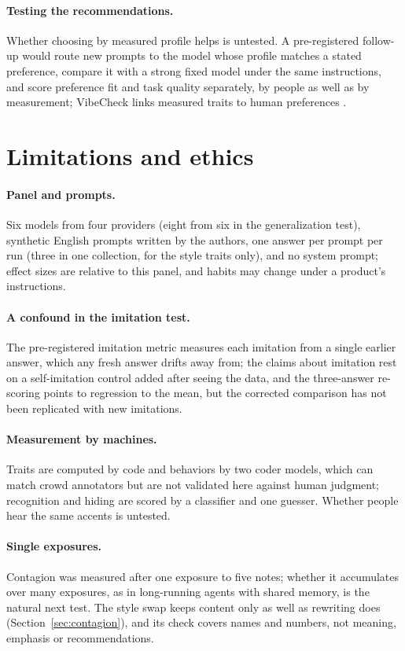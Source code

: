 \documentclass[11pt]{article}
\begin{document}
\paragraph{Testing the recommendations.}
Whether choosing by measured profile helps is untested.
A pre-registered follow-up would route new prompts to the model whose profile matches a stated preference, compare it with a strong fixed model under the same instructions, and score preference fit and task quality separately, by people as well as by measurement; VibeCheck links measured traits to human preferences \citep{dunlap2025vibecheck}.

\section{Limitations and ethics}
\label{sec:limits}
\paragraph{Panel and prompts.} Six models from four providers (eight from six in the generalization test), synthetic English prompts written by the authors, one answer per prompt per run (three in one collection, for the style traits only), and no system prompt; effect sizes are relative to this panel, and habits may change under a product's instructions.
\paragraph{A confound in the imitation test.} The pre-registered imitation metric measures each imitation from a single earlier answer, which any fresh answer drifts away from; the claims about imitation rest on a self-imitation control added after seeing the data, and the three-answer re-scoring points to regression to the mean, but the corrected comparison has not been replicated with new imitations.
\paragraph{Measurement by machines.} Traits are computed by code and behaviors by two coder models, which can match crowd annotators \citep{gilardi2023chatgpt} but are not validated here against human judgment; recognition and hiding are scored by a classifier and one guesser. Whether people hear the same accents is untested.
\paragraph{Single exposures.} Contagion was measured after one exposure to five notes; whether it accumulates over many exposures, as in long-running agents with shared memory, is the natural next test. The style swap keeps content only as well as rewriting does (Section~\ref{sec:contagion}), and its check covers names and numbers, not meaning, emphasis or recommendations.
\end{document}
